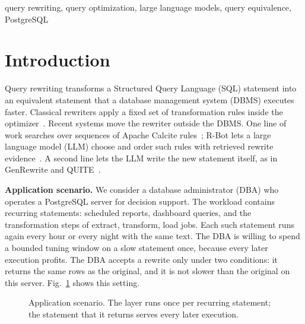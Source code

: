 \documentclass[conference]{IEEEtran}
\begin{document}
\begin{IEEEkeywords}
query rewriting, query optimization, large language models, query equivalence, PostgreSQL
\end{IEEEkeywords}

\section{Introduction}
\label{sec:intro}

Query rewriting transforms a Structured Query Language (SQL) statement into an equivalent statement that a database management system (DBMS) executes faster.
Classical rewriters apply a fixed set of transformation rules inside the optimizer~\cite{pirahesh1992,graefe1995,chaudhuri1998}.
Recent systems move the rewriter outside the DBMS.
One line of work searches over sequences of Apache Calcite rules~\cite{begoli2018,zhou2021,li2024}; R-Bot lets a large language model (LLM) choose and order such rules with retrieved rewrite evidence~\cite{sun2025}.
A second line lets the LLM write the new statement itself, as in GenRewrite and QUITE~\cite{liu2026,song2025}.

\textbf{Application scenario.}
We consider a database administrator (DBA) who operates a PostgreSQL server for decision support.
The workload contains recurring statements: scheduled reports, dashboard queries, and the transformation steps of extract, transform, load jobs.
Each such statement runs again every hour or every night with the same text.
The DBA is willing to spend a bounded tuning window on a slow statement once, because every later execution profits.
The DBA accepts a rewrite only under two conditions: it returns the same rows as the original, and it is not slower than the original on this server.
Fig.~\ref{fig:scenario} shows this setting.

\begin{figure}[t]
  \centering
  
  \caption{Application scenario. The layer runs once per recurring statement; the statement that it returns serves every later execution.}
  \label{fig:scenario}
\end{figure}
\end{document}
